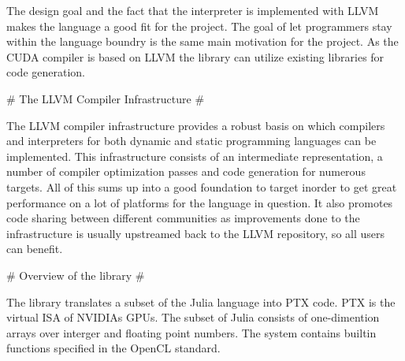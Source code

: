 \begin{markdown}
The design goal and the fact that the interpreter is implemented with
\gls{LLVM} makes the language a good fit for the project. The goal of
let programmers stay within the language boundry is the same main
motivation for the project. As the \gls{CUDA} compiler is based on
\gls{LLVM} the library can utilize existing libraries for code
generation.

# The LLVM Compiler Infrastructure #

The \gls{LLVM} compiler infrastructure provides a robust basis on
which compilers and interpreters for both dynamic and static
programming languages can be implemented. This infrastructure consists
of an intermediate representation, a number of compiler optimization
passes and code generation for numerous targets. All of this sums up
into a good foundation to target inorder to get great performance on a
lot of platforms for the language in question. It also promotes code
sharing between different communities as improvements done to the
infrastructure is usually upstreamed back to the LLVM repository, so
all users can benefit.

# Overview of the library #

The library translates a subset of the Julia language into \gls{PTX}
code. \gls{PTX} is the virtual \gls{ISA} of NVIDIAs
\glspl{GPU}. The subset of Julia consists of one-dimention arrays over
interger and floating point numbers. The system contains builtin
functions specified in the \gls{OpenCL} standard.


\end{markdown}
